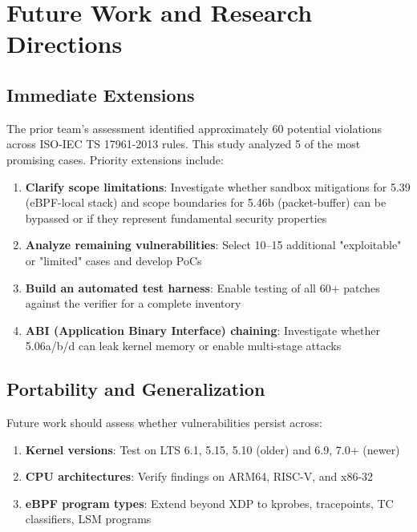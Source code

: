\section{Future Work and Research Directions}

\subsection{Immediate Extensions}

The prior team's assessment identified approximately 60 potential violations across ISO-IEC TS 17961-2013 rules. This study analyzed 5 of the most promising cases. Priority extensions include:

\begin{enumerate}[label=\arabic*.]
  \item \textbf{Clarify scope limitations}: Investigate whether sandbox mitigations for 5.39 (eBPF-local stack) and scope boundaries for 5.46b (packet-buffer) can be bypassed or if they represent fundamental security properties
  \item \textbf{Analyze remaining vulnerabilities}: Select 10--15 additional "exploitable" or "limited" cases and develop PoCs
  \item \textbf{Build an automated test harness}: Enable testing of all 60+ patches against the verifier for a complete inventory
  \item \textbf{ABI (Application Binary Interface) chaining}: Investigate whether 5.06a/b/d can leak kernel memory or enable multi-stage attacks
\end{enumerate}

\subsection{Portability and Generalization}

Future work should assess whether vulnerabilities persist across:

\begin{enumerate}[label=\arabic*.]
  \item \textbf{Kernel versions}: Test on LTS 6.1, 5.15, 5.10 (older) and 6.9, 7.0+ (newer)
  \item \textbf{CPU architectures}: Verify findings on ARM64, RISC-V, and x86-32
  \item \textbf{eBPF program types}: Extend beyond XDP to kprobes, tracepoints, TC classifiers, LSM programs
\end{enumerate}

